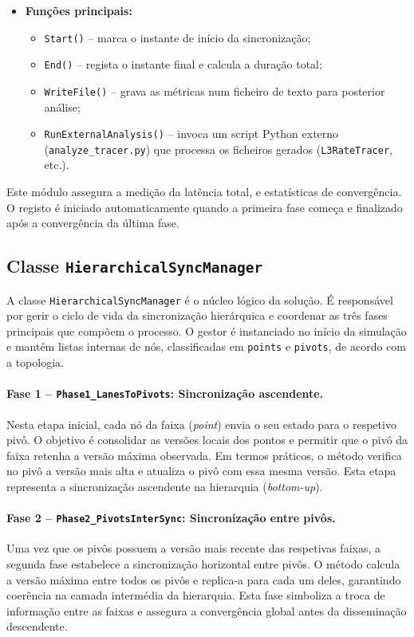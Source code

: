 \begin{itemize}
    \item \textbf{Funções principais:}
    \begin{itemize}
        \item \texttt{Start()} – marca o instante de início da sincronização;
        \item \texttt{End()} – regista o instante final e calcula a duração total;
        \item \texttt{WriteFile()} – grava as métricas num ficheiro de texto para posterior análise;
        \item \texttt{RunExternalAnalysis()} – invoca um script Python externo (\texttt{analyze\_tracer.py}) que processa os ficheiros gerados (\texttt{L3RateTracer}, etc.).
    \end{itemize}
\end{itemize}

Este módulo assegura a medição da latência total, e estatísticas de convergência. O registo é iniciado automaticamente quando a primeira fase começa e finalizado após a convergência da última fase.

\subsection{Classe \texttt{HierarchicalSyncManager}}

A classe \texttt{HierarchicalSyncManager} é o núcleo lógico da solução. É responsável por gerir o ciclo de vida da sincronização hierárquica e coordenar as três fases principais que compõem o processo. O gestor é instanciado no início da simulação e mantém listas internas de nós, classificadas em \texttt{points} e \texttt{pivots}, de acordo com a topologia.

\paragraph{Fase 1 – \texttt{Phase1\_LanesToPivots}: Sincronização ascendente.}
Nesta etapa inicial, cada nó da faixa (\textit{point}) envia o seu estado para o respetivo pivô. O objetivo é consolidar as versões locais dos pontos e permitir que o pivô da faixa retenha a versão máxima observada. Em termos práticos, o método verifica no pivô a versão mais alta e atualiza o pivô com essa mesma versão. Esta etapa representa a sincronização ascendente na hierarquia (\textit{bottom-up}).

\paragraph{Fase 2 – \texttt{Phase2\_PivotsInterSync}: Sincronização entre pivôs.}
Uma vez que os pivôs possuem a versão mais recente das respetivas faixas, a segunda fase estabelece a sincronização horizontal entre pivôs. O método calcula a versão máxima entre todos os pivôs e replica-a para cada um deles, garantindo coerência na camada intermédia da hierarquia. Esta fase simboliza a troca de informação entre as faixas e assegura a convergência global antes da disseminação descendente.

